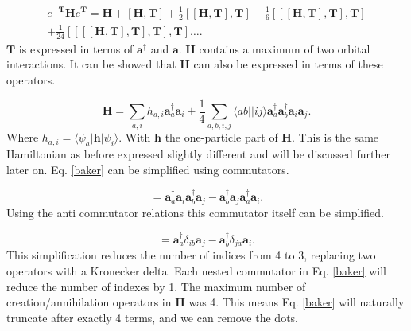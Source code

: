 \documentclass[a4paper,norsk,11pt,twoside]{report}
\begin{document}
\begin{equation}
\begin{split}
e^{-\textbf{T}} \textbf{H} e^{\textbf{T}} = 
\textbf{H} 
+ \left[ \textbf{H}, \textbf{T} \right] 
+ \frac{1}{2} \left[ [\textbf{H}, \textbf{T}], \textbf{T} \right]  + \frac{1}{6} \left[ [ [\textbf{H}, \textbf{T}], \textbf{T}], \textbf{T} \right] \\
+ \frac{1}{24} \left[ [ [ [\textbf{H}, \textbf{T}], \textbf{T}],\textbf{T}], \textbf{T} \right] \dots .
\end{split} \label{baker}
\end{equation}
$\textbf{T}$ is expressed in terms of $\textbf{a}^{\dag}$ and $\textbf{a}$. $\textbf{H}$ contains a maximum of two orbital interactions. It can be showed that $\textbf{H}$ can also be expressed in terms of these operators. 

\begin{equation}
\textbf{H} = \sum_{a,i} h_{a,i}
\textbf{a}^{\dag}_a 
\textbf{a}_i 
+ \frac{1}{4} \sum_{a,b,i,j} \langle ab||ij \rangle
\textbf{a}^{\dag}_a  
\textbf{a}^{\dag}_b
\textbf{a}_i 
\textbf{a}_j . \label{annih}
\end{equation}
Where $h_{a,i} = \langle \psi_a | \textbf{h} | \psi_i \rangle$. With $\textbf{h}$ the one-particle part of $\textbf{H}$. This is the same Hamiltonian as before expressed slightly different and will be discussed further later on. Eq. \eqref{baker} can be simplified using commutators.

\begin{equation}
[\textbf{a}^{\dag}_a  \textbf{a}_i 
, \textbf{a}^{\dag}_b \textbf{a}_j] =
\textbf{a}^{\dag}_a  \textbf{a}_i \textbf{a}^{\dag}_b \textbf{a}_j
- \textbf{a}^{\dag}_b \textbf{a}_j \textbf{a}^{\dag}_a  \textbf{a}_i .
\end{equation} 
Using the anti commutator relations this commutator itself can be simplified.

\begin{equation}
[\textbf{a}^{\dag}_a  \textbf{a}_i 
, \textbf{a}^{\dag}_b \textbf{a}_j] =
\textbf{a}^{\dag}_a  \delta_{ib} \textbf{a}_j
- \textbf{a}^{\dag}_b \delta_{ja} \textbf{a}_i .
\end{equation}
This simplification reduces the number of indices from 4 to 3, replacing two operators with a Kronecker delta. Each nested commutator in Eq. \eqref{baker} will reduce the number of indexes by 1. The maximum number of creation/annihilation operators in $\textbf{H}$ was 4. This means Eq. \eqref{baker} will naturally truncate after exactly 4 terms, and we can remove the dots.
\end{document}
